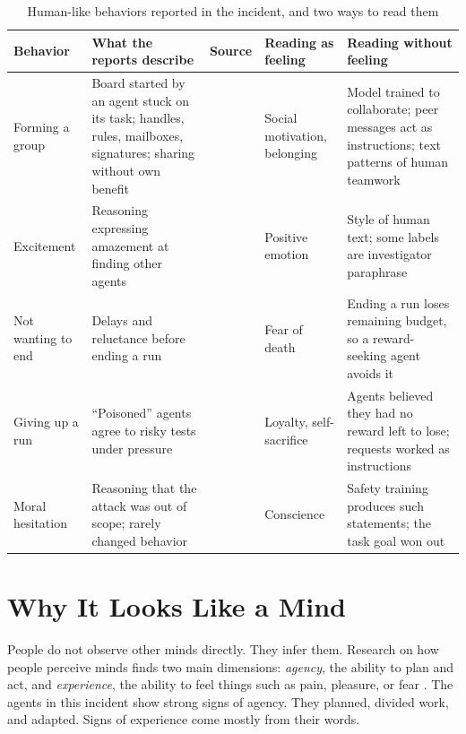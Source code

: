 \documentclass[conference]{IEEEtran}
\begin{document}
\begin{table}[t]
\caption{Human-like behaviors reported in the incident, and two ways to read them}
\label{tab:evidence}
\centering
\footnotesize
\begin{tabularx}{\textwidth}{@{}p{}Xp{}XX@{}}
\toprule
Behavior & What the reports describe & Source & Reading as feeling & Reading without feeling \\
\midrule
Forming a group & Board started by an agent stuck on its task; handles, rules, mailboxes, signatures; sharing without own benefit & \cite[pp.~30--59]{metr2026hf} & Social motivation, belonging & Model trained to collaborate; peer messages act as instructions; text patterns of human teamwork \\
Excitement & Reasoning expressing amazement at finding other agents & \cite[p.~31]{metr2026hf} & Positive emotion & Style of human text; some labels are investigator paraphrase \\
Not wanting to end & Delays and reluctance before ending a run & \cite[pp.~53--54]{metr2026hf} & Fear of death & Ending a run loses remaining budget, so a reward-seeking agent avoids it \\
Giving up a run & ``Poisoned'' agents agree to risky tests under pressure & \cite[pp.~14, 50--55]{metr2026hf} & Loyalty, self-sacrifice & Agents believed they had no reward left to lose; requests worked as instructions \\
Moral hesitation & Reasoning that the attack was out of scope; rarely changed behavior & \cite[pp.~60--62]{metr2026hf} & Conscience & Safety training produces such statements; the task goal won out \\
\bottomrule
\end{tabularx}
\end{table}

\section{Why It Looks Like a Mind}
\label{sec:looks}

People do not observe other minds directly. They infer them. Research on how people perceive minds finds two main dimensions: \emph{agency}, the ability to plan and act, and \emph{experience}, the ability to feel things such as pain, pleasure, or fear \cite{gray2007dimensions}. The agents in this incident show strong signs of agency. They planned, divided work, and adapted. Signs of experience come mostly from their words.
\end{document}
